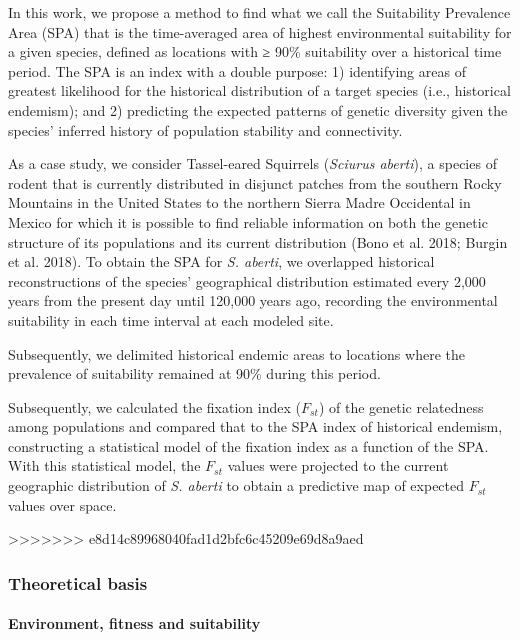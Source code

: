 \documentclass[
]{article}
\begin{document}
In this work, we propose a method to find what we call the Suitability Prevalence Area
(SPA) that is the time-averaged area of highest environmental suitability for a given species, defined as locations with ≥ 90\% suitability over a historical time period. The SPA is an index with a double purpose: 1) identifying areas of greatest likelihood for the historical distribution of a target species (i.e., historical endemism); and 2) predicting the expected patterns of genetic diversity given the species' inferred history of population stability and connectivity. 

As a case study, we consider Tassel-eared Squirrels (\emph{Sciurus aberti}), a species of rodent that is currently distributed in disjunct patches from the southern Rocky Mountains in the United States to the northern Sierra Madre Occidental in Mexico for which it is possible to find reliable information on both the genetic structure of its populations and its current distribution (Bono et al. 2018; Burgin et al. 2018). To obtain the SPA for \textit{S. aberti}, we overlapped historical reconstructions of the species' geographical distribution estimated every 2,000 years from the present day until 120,000 years ago, recording the environmental suitability in each time interval at each modeled site.

Subsequently, we delimited historical endemic areas to locations where
the prevalence of suitability remained at 90\% during this period. 

Subsequently, we calculated the fixation index (\(F_{st}\)) of the genetic relatedness among populations and compared that to the SPA index of historical endemism, constructing a statistical model of the fixation index as a function of the SPA. With this statistical model, the \(F_{st}\) values were projected to the current geographic distribution of \textit{S. aberti} to obtain a predictive map of expected \(F_{st}\) values over space.

>>>>>>> e8d14c89968040fad1d2bfc6c45209e69d8a9aed

\hypertarget{theoretical-basis}{%
\subsubsection{Theoretical basis}\label{theoretical-basis}}

\hypertarget{environment-fitness-and-suitability}{%
\paragraph{Environment, fitness and
suitability}\label{environment-fitness-and-suitability}}
\end{document}

